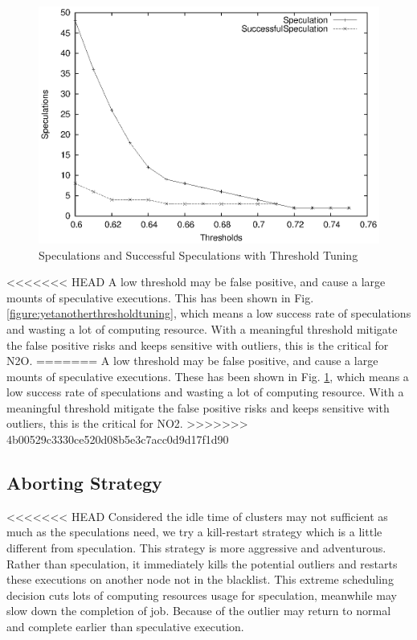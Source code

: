\begin{figure}
\centering
\includegraphics[width=0.9\columnwidth]{figures/threshold&speculation.eps}
\caption{Speculations and Successful Speculations with Threshold Tuning}
\label{figure:thresholdtuning}
\end{figure}

<<<<<<< HEAD
A low threshold may be false positive, and cause a large mounts of speculative executions. This has been shown in Fig.  \ref{figure:yetanotherthresholdtuning}, which means a low success rate of speculations and wasting a lot of computing resource. With a meaningful threshold mitigate the false positive risks and keeps sensitive with outliers, this is the critical for N2O.
=======
A low threshold may be false positive, and cause a large mounts of speculative executions. These has been shown in Fig.  \ref{figure:thresholdtuning}, which means a low success rate of speculations and wasting a lot of computing resource. With a meaningful threshold mitigate the false positive risks and keeps sensitive with outliers, this is the critical for NO2.
>>>>>>> 4b00529c3330ce520d08b5e3c7acc0d9d17f1d90

\subsection{Aborting Strategy}

<<<<<<< HEAD
Considered the idle time of clusters may not sufficient as much as the speculations need, we try a kill-restart strategy which is a little different from speculation. This strategy is more aggressive and adventurous. Rather than speculation, it immediately kills the potential outliers and restarts these executions on another node not in the blacklist. This extreme scheduling decision cuts lots of computing resources usage for speculation, meanwhile may slow down the completion of job. Because of the outlier may return to normal and complete earlier than speculative execution.

